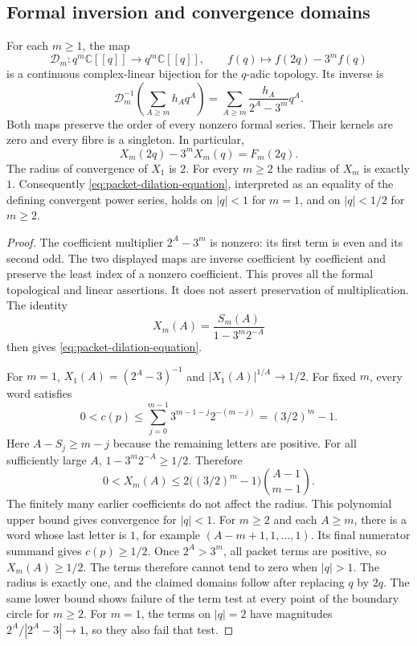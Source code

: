 \subsection{Formal inversion and convergence domains}

\begin{proposition}\label{prop:packet-dilation-inverse}
For each $m\ge1$, the map
\[
 \mathcal D_m:q^m\mathbb C[[q]]\longrightarrow q^m\mathbb C[[q]],
 \qquad f(q)\longmapsto f(2q)-3^m f(q)
\]
is a continuous complex-linear bijection for the $q$-adic topology.
Its inverse is
\[
 \mathcal D_m^{-1}\!\left(\sum_{A\ge m}h_Aq^A\right)
 =\sum_{A\ge m}\frac{h_A}{2^A-3^m}q^A.
\]
Both maps preserve the order of every nonzero formal series.  Their
kernels are zero and every fibre is a singleton.  In particular,
\begin{equation}\label{eq:packet-dilation-equation}
 X_m(2q)-3^mX_m(q)=F_m(2q).
\end{equation}
The radius of convergence of $X_1$ is $2$.  For every $m\ge2$ the
radius of $X_m$ is exactly $1$.  Consequently
\eqref{eq:packet-dilation-equation}, interpreted as an equality of the
defining convergent power series, holds on $|q|<1$ for $m=1$, and on
$|q|<1/2$ for $m\ge2$.
\end{proposition}
\begin{proof}
The coefficient multiplier $2^A-3^m$ is nonzero: its first term is even
and its second odd.  The two displayed maps are inverse coefficient by
coefficient and preserve the least index of a nonzero coefficient.
This proves all the formal topological and linear assertions.  It does
not assert preservation of multiplication.  The identity
\[
 X_m(A)=\frac{S_m(A)}{1-3^m2^{-A}}
\]
then gives \eqref{eq:packet-dilation-equation}.

For $m=1$, $X_1(A)=(2^A-3)^{-1}$ and
$|X_1(A)|^{1/A}\to1/2$.  For fixed $m$, every word satisfies
\[
 0<c(p)\le \sum_{j=0}^{m-1}3^{m-1-j}2^{-(m-j)}
 =(3/2)^m-1.
\]
Here $A-S_j\ge m-j$ because the remaining letters are positive.
For all sufficiently large $A$, $1-3^m2^{-A}\ge1/2$.  Therefore
\[
 0<X_m(A)\le 2\bigl((3/2)^m-1\bigr)\binom{A-1}{m-1}.
\]
The finitely many earlier coefficients do not affect the radius.  This
polynomial upper bound gives convergence for $|q|<1$.  For $m\ge2$
and each $A\ge m$, there is a word whose last letter is $1$, for example
$(A-m+1,1,\ldots,1)$.  Its final numerator summand gives $c(p)\ge1/2$.
Once $2^A>3^m$, all packet terms are positive, so $X_m(A)\ge1/2$.
The terms therefore cannot tend to zero when $|q|>1$.  The radius is
exactly one, and the claimed domains follow after replacing $q$ by $2q$.
The same lower bound shows failure of the term test at every point of
the boundary circle for $m\ge2$.  For $m=1$, the terms on $|q|=2$
have magnitudes $2^A/|2^A-3|\to1$, so they also fail that test.
\end{proof}

